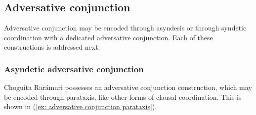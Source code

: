 \subsection{Adversative conjunction}
\label{subsec: adversative conjunction}

Adversative conjunction may be encoded through asyndesis or through syndetic coordination with a dedicated adversative conjunction. Each of these constructions is addressed next.

\subsubsection{Asyndetic adversative conjunction}
\label{subsubsec: asyndetic adversative conjunction}

Choguita Rarámuri possesses an adversative conjunction construction, which may be encoded through parataxis, like other forms of clausal coordination. This is shown in (\ref{ex: adversative conjunction parataxis}).


\ea\label{ex: adversative conjunction parataxis}

